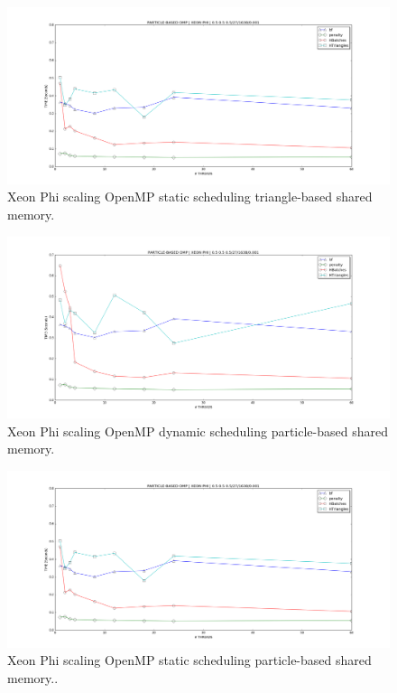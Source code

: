 \begin{figure}[htb]
  \begin{center}
    \includegraphics[width=1\textwidth]{experiments/random/omp/xeon_phi_regular_G0_particle_static.png}
  \end{center}
  \caption{Xeon Phi scaling OpenMP static scheduling triangle-based shared memory.}
  \label{figure:triangle_omp}
\end{figure}

\begin{figure}[htb]
  \begin{center}
    \includegraphics[width=1\textwidth]{experiments/random/omp/xeon_phi_regular_G0_particle_dynamic.png}
  \end{center}
  \caption{Xeon Phi scaling OpenMP dynamic scheduling particle-based shared memory.}
  \label{figure:triangle_omp}
\end{figure}

\begin{figure}[htb]
  \begin{center}
    \includegraphics[width=1\textwidth]{experiments/random/omp/xeon_phi_regular_G0_particle_static.png}
  \end{center}
  \caption{Xeon Phi scaling OpenMP static scheduling particle-based shared memory..}
  \label{figure:triangle_omp}
\end{figure}